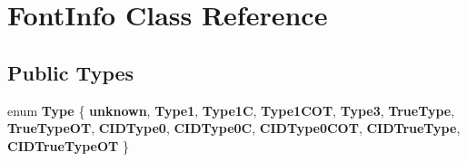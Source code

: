 \hypertarget{class_font_info}{}\section{Font\+Info Class Reference}
\label{class_font_info}
\subsection*{Public Types}
\begin{DoxyCompactItemize}
\item 
\mbox{\label{class_font_info_a65427072e12c3a74d89eecf8ea8171a6}} 
enum {\bfseries Type} \{ \newline
{\bfseries unknown}, 
{\bfseries Type1}, 
{\bfseries Type1C}, 
{\bfseries Type1\+C\+OT}, 
\newline
{\bfseries Type3}, 
{\bfseries True\+Type}, 
{\bfseries True\+Type\+OT}, 
{\bfseries C\+I\+D\+Type0}, 
\newline
{\bfseries C\+I\+D\+Type0C}, 
{\bfseries C\+I\+D\+Type0\+C\+OT}, 
{\bfseries C\+I\+D\+True\+Type}, 
{\bfseries C\+I\+D\+True\+Type\+OT}
 \}
\end{DoxyCompactItemize}
